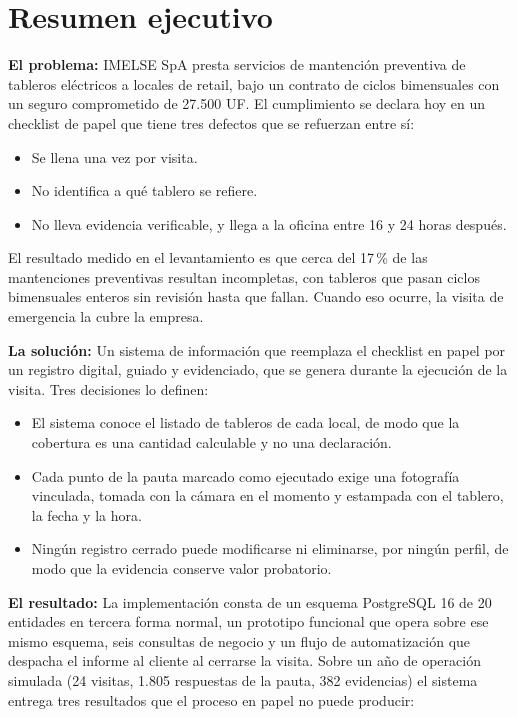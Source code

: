 \documentclass[10pt,letterpaper]{article}
\begin{document}
\section{Resumen ejecutivo}

\textbf{El problema:} IMELSE SpA presta servicios de mantención preventiva de
tableros eléctricos a locales de retail, bajo un contrato de ciclos
bimensuales con un seguro comprometido de 27.500 UF. El cumplimiento se
declara hoy en un checklist de papel que tiene tres defectos que se refuerzan
entre sí: 
\begin{itemize}
\item  Se llena una vez por visita.
\item No identifica a qué tablero se refiere.
\item No lleva evidencia verificable, y llega a la oficina entre 16 y 24 horas después. 
\end{itemize}
El resultado medido en el levantamiento es que cerca del 17\,\%
de las mantenciones preventivas resultan incompletas, con tableros que pasan
ciclos bimensuales enteros sin revisión hasta que fallan. Cuando eso ocurre, la
visita de emergencia la cubre la empresa.

\textbf{La solución:} Un sistema de información que reemplaza el checklist en
papel por un registro digital, guiado y evidenciado, que se genera durante la
ejecución de la visita. Tres decisiones lo definen:
\begin{itemize}
\item El sistema conoce el listado de tableros de cada local, de modo que la cobertura es una cantidad calculable y no una declaración.
\item Cada punto de la pauta marcado como ejecutado exige una fotografía vinculada, tomada con la cámara en el momento y estampada con el tablero, la fecha y la hora.
\item Ningún registro cerrado puede modificarse ni eliminarse, por ningún perfil, de modo que la evidencia conserve valor probatorio.
\end{itemize}
\textbf{El resultado:} La implementación consta de un esquema PostgreSQL 16 de
20 entidades en tercera forma normal, un prototipo funcional que opera sobre
ese mismo esquema, seis consultas de negocio y un flujo de automatización que
despacha el informe al cliente al cerrarse la visita. Sobre un año de operación
simulada (24 visitas, 1.805 respuestas de la pauta, 382 evidencias) el sistema
entrega tres resultados que el proceso en papel no puede producir:
\end{document}
